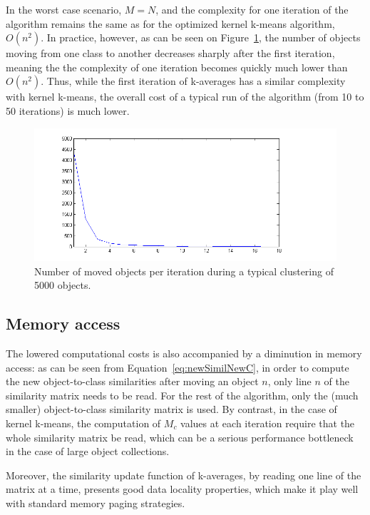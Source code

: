 \documentclass[a4paper,twoside]{article}
\begin{document}
In the worst case scenario, $M = N$, and the complexity for one iteration of the algorithm remains the same as for the optimized kernel k-means algorithm, $O(n^2)$. In practice, however, as can be seen on Figure~\ref{fig:moved}, the number of objects moving from one class to another decreases sharply after the first iteration, meaning the the complexity of one iteration becomes quickly much lower than $O(n^2)$. Thus, while the first iteration of k-averages has a similar complexity with kernel k-means, the overall cost of a typical run of the algorithm (from 10 to 50 iterations) is much lower.

\begin{figure}
\label{fig:moved}
\includegraphics[scale=0.6]{figures/nbMoved.png} 
\caption{Number of moved objects per iteration during a typical clustering of 5000 objects.}
\end{figure}

\subsection{Memory access}

The lowered computational costs is also accompanied by a diminution in memory access: as can be seen from Equation~\ref{eq:newSimilNewC}, in order to compute the new object-to-class similarities after moving an object $n$, only line $n$ of the similarity matrix needs to be read. For the rest of the algorithm, only the (much smaller) object-to-class similarity matrix is used. By contrast, in the case of kernel k-means, the computation of $M_c$ values at each iteration require that the whole similarity matrix be read, which can be a serious performance bottleneck in the case of large object collections.

Moreover, the similarity update function of k-averages, by reading one line of the matrix at a time, presents good data locality properties, which make it play well with standard memory paging strategies.
\end{document}

